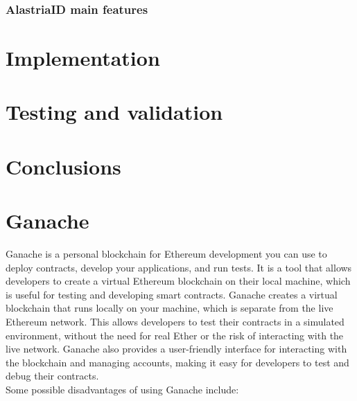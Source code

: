 \documentclass[target=mst,aauheader=]{thud}
\begin{document}
\subsection{AlastriaID main features}


\chapter{Implementation}

\chapter{Testing and validation}

\chapter{Conclusions}

\appendix


\chapter{Ganache}
Ganache is a personal blockchain for Ethereum development you can use to deploy contracts, develop your applications, and run tests. It is a tool that allows developers to create a virtual Ethereum blockchain on their local machine, which is useful for testing and developing smart contracts. Ganache creates a virtual blockchain that runs locally on your machine, which is separate from the live Ethereum network. This allows developers to test their contracts in a simulated environment, without the need for real Ether or the risk of interacting with the live network. Ganache also provides a user-friendly interface for interacting with the blockchain and managing accounts, making it easy for developers to test and debug their contracts.\\

Some possible disadvantages of using Ganache include:
\end{document}
